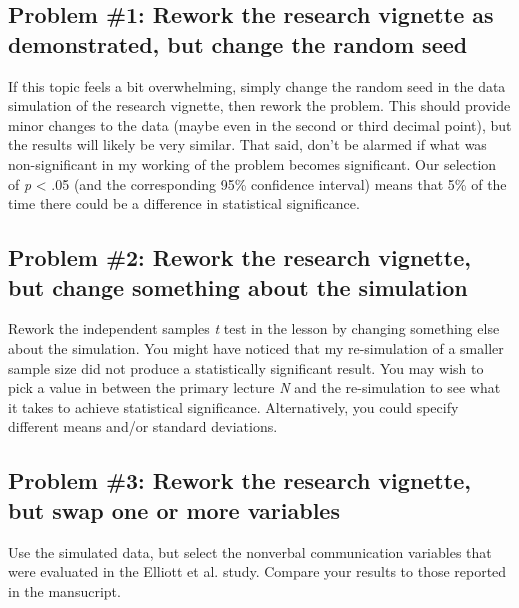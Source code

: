 \documentclass[
  11pt,
]{book}
\begin{document}
\hypertarget{problem-1-rework-the-research-vignette-as-demonstrated-but-change-the-random-seed-1}{%
\subsection{Problem \#1: Rework the research vignette as demonstrated, but change the random seed}\label{problem-1-rework-the-research-vignette-as-demonstrated-but-change-the-random-seed-1}}

If this topic feels a bit overwhelming, simply change the random seed in the data simulation of the research vignette, then rework the problem. This should provide minor changes to the data (maybe even in the second or third decimal point), but the results will likely be very similar. That said, don't be alarmed if what was non-significant in my working of the problem becomes significant. Our selection of \emph{p} \textless{} .05 (and the corresponding 95\% confidence interval) means that 5\% of the time there could be a difference in statistical significance.

\hypertarget{problem-2-rework-the-research-vignette-but-change-something-about-the-simulation-1}{%
\subsection{Problem \#2: Rework the research vignette, but change something about the simulation}\label{problem-2-rework-the-research-vignette-but-change-something-about-the-simulation-1}}

Rework the independent samples \emph{t} test in the lesson by changing something else about the simulation. You might have noticed that my re-simulation of a smaller sample size did not produce a statistically significant result. You may wish to pick a value in between the primary lecture \emph{N} and the re-simulation to see what it takes to achieve statistical significance. Alternatively, you could specify different means and/or standard deviations.

\hypertarget{problem-3-rework-the-research-vignette-but-swap-one-or-more-variables}{%
\subsection{Problem \#3: Rework the research vignette, but swap one or more variables}\label{problem-3-rework-the-research-vignette-but-swap-one-or-more-variables}}

Use the simulated data, but select the nonverbal communication variables that were evaluated in the Elliott et al. \citeyearpar{elliott_differences_2016}study. Compare your results to those reported in the mansucript.
\end{document}
